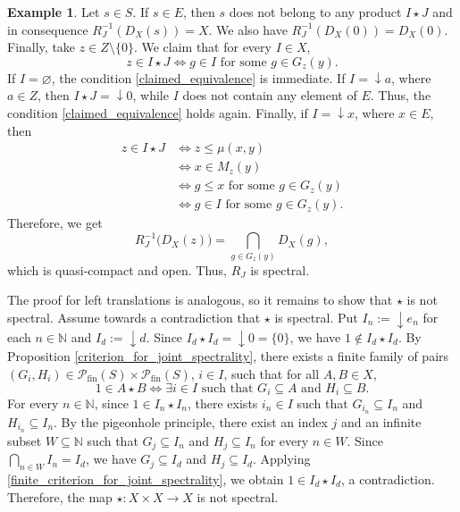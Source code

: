 \documentclass[10pt, reqno]{amsart}
\theoremstyle{plain}
\theoremstyle{definition}
\newtheorem{example}[theorem]{Example}
\begin{document}
\begin{example}
    Let $s \in S$. If $s\in E$, then $s$ does not belong to any product $I \star J$ and in consequence $R_J^{-1}(D_X(s)) = X$. We also have $R_J^{-1}(D_X(0)) = D_X(0)$. Finally, take $z \in Z\setminus\{0\}$. We claim that for every $I \in X$, 
    \begin{equation}\label{claimed_equivalence}
    z \in I \star J \iff g \in I \text{ for some } g\in G_z(y).
    \end{equation}
    If $I = \varnothing$, the condition \eqref{claimed_equivalence} is immediate. If $I = \downarrow a$, where $a \in Z$, then $I \star J = \downarrow 0$, while $I$ does not contain any element of $E$. Thus, the condition \eqref{claimed_equivalence} holds again. Finally, if $I = \downarrow x$, where $x \in E$, then 
    \begin{align*}
        z \in I \star J &\iff z \leqslant \mu(x, y) \\ & \iff x\in M_z(y) \\ & \iff g \leqslant x \text{ for some } g\in G_z(y) \\ & \iff g\in I\text{ for some } g \in G_z(y). 
    \end{align*}
    Therefore, we get $$R_J^{-1}\big(D_X(z)\big) = \bigcap_{g\in G_z(y)} D_X(g),$$ which is quasi-compact and open. Thus, $R_J$ is spectral. 
    
    The proof for left translations is analogous, so it remains to show that $\star$ is not spectral. Assume towards a contradiction that $\star$ is spectral. Put $I_n := \downarrow e_n$ for each $n \in \mathbb{N}$ and $I_d := \downarrow d$. Since $I_d \star I_d = \downarrow 0 = \{0\}$, we have $1 \not\in I_d \star I_d$. By Proposition \ref{criterion_for_joint_spectrality}, there exists a finite family of pairs $(G_i, H_i)\in\mathcal{P}_\mathrm{fin}(S)\times\mathcal{P}_\mathrm{fin}(S)$, $i\in I$, such that for all $A, B \in X$, 
    \begin{equation}\label{finite_criterion_for_joint_spectrality}
        1 \in A \star B \iff \exists i\in I\text{ such that } G_i\subseteq A\text{ and } H_i\subseteq B.
    \end{equation}
    For every $n\in\mathbb{N}$, since $1 \in I_n\star I_n$, there exists $i_n \in I$ such that $G_{i_n}\subseteq I_n$ and $H_{i_n}\subseteq I_n$. By the pigeonhole principle, there exist an index $j$ and an infinite subset $W \subseteq \mathbb{N}$ such that $G_j\subseteq I_n$ and $H_j\subseteq I_n$ for every $n \in W$. Since $\bigcap_{n \in W}I_n = I_d$, we have $G_j\subseteq I_d$ and $H_j \subseteq I_d$. Applying \eqref{finite_criterion_for_joint_spectrality}, we obtain $1 \in I_d\star I_d$, a contradiction. Therefore, the map $\star: X \times X \to X$ is not spectral. 
\end{example}


\end{document}
